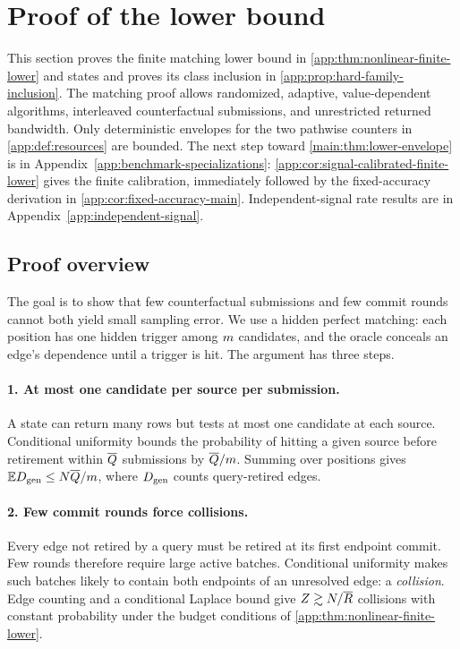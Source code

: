 \section{Proof of the lower bound}
\label{app:lower-proof}

This section proves the finite matching lower bound in
\cref{app:thm:nonlinear-finite-lower} and states and proves its class
inclusion in \cref{app:prop:hard-family-inclusion}.
The matching proof allows randomized,
adaptive, value-dependent algorithms, interleaved counterfactual submissions,
and unrestricted returned bandwidth.  Only deterministic envelopes for the two pathwise counters in
\textcolor{red}{\cref{app:def:resources}} are bounded.
The next step toward \cref{main:thm:lower-envelope} is in
Appendix~\ref{app:benchmark-specializations}:
\cref{app:cor:signal-calibrated-finite-lower} gives the finite calibration,
immediately followed by the fixed-accuracy derivation in
\cref{app:cor:fixed-accuracy-main}.
\ifincludeexponents
Independent-signal rate results are in Appendix~\ref{app:independent-signal}.
\fi

\subsection{Proof overview}
\label{app:lower-proof-overview}

The goal is to show that few counterfactual submissions and few commit
rounds cannot both yield small sampling error.  We use a hidden perfect
matching: each position has one hidden trigger among \(m\)
candidates, and the oracle conceals an edge's dependence until a trigger
is hit.  The argument has three steps.

\paragraph{1. At most one candidate per source per submission.}
A state can return many rows but tests at most one candidate at each
source.  Conditional uniformity bounds the probability of hitting a given
source before retirement within \(\overline Q{}\) submissions by
\(\overline Q{}/m\). Summing over positions gives
\(\mathbb ED_{\mathrm{gen}}\le N\overline Q{}/m\), where
\(D_{\mathrm{gen}}\) counts query-retired edges.

\paragraph{2. Few commit rounds force collisions.}
Every edge not retired by a query must be retired at its first endpoint
commit.  Few rounds therefore require large active batches.  Conditional
uniformity makes such batches likely to contain both endpoints of an
unresolved edge: a \emph{collision}.  Edge counting and a conditional
Laplace bound give \(Z\gtrsim N/\overline R{}\) collisions
with constant probability under the budget conditions of
\cref{app:thm:nonlinear-finite-lower}.

